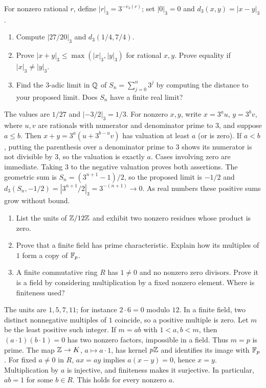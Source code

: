 For nonzero rational $r$, define $|r|_3=3^{-v_3(r)}$; set $|0|_3=0$
and $d_3(x,y)=|x-y|_3$.
\begin{enumerate}
\item Compute $|27/20|_3$ and $d_3(1/4,7/4)$. 
\item Prove $|x+y|_3\le\max(|x|_3,|y|_3)$ for rational $x,y$.
Prove equality if $|x|_3\ne|y|_3$. 
\item Find the $3$-adic limit in $\mathbb Q$ of $S_n=\sum_{j=0}^n3^j$ by
computing the distance to your proposed limit. Does $S_n$ have a finite
real limit? 
\end{enumerate}
\begin{solution}
The values are $1/27$ and $|-3/2|_3=1/3$.
For nonzero $x,y$, write $x=3^a u$, $y=3^b v$, where $u,v$ are
rationals with numerator and denominator prime to $3$, and suppose $a\le b$.
Then $x+y=3^a(u+3^{b-a}v)$ has valuation at least $a$ (or is zero).
If $a<b$, putting the parenthesis over a denominator prime to $3$
shows its numerator is not divisible by $3$, so the valuation is exactly
$a$. Cases involving zero are immediate. Taking $3$ to the negative
valuation proves both assertions.
The geometric sum is $S_n=(3^{n+1}-1)/2$, so the proposed limit is
$-1/2$ and $d_3(S_n,-1/2)=|3^{n+1}/2|_3=3^{-(n+1)}\to0$.
As real numbers these positive sums grow without bound.
\end{solution}

\studentbreak
{}
\begin{enumerate}
\item List the units of $\mathbb Z/12\mathbb Z$ and exhibit two nonzero residues
whose product is zero. 
\item Prove that a finite field has prime characteristic. Explain
how its multiples of $1$ form a copy of $\mathbb F_p$. 
\item A finite commutative ring $R$ has $1\ne0$ and no nonzero zero
divisors. Prove it is a field by considering multiplication by a fixed
nonzero element. Where is finiteness used? 
\end{enumerate}
\begin{solution}
The units are $1,5,7,11$; for instance $2\cdot6=0$ modulo $12$.
In a finite field, two distinct nonnegative multiples of $1$ coincide,
so a positive multiple is zero. Let $m$ be the least positive such
integer. If $m=ab$ with $1<a,b<m$, then
$(a\cdot1)(b\cdot1)=0$ has two nonzero factors, impossible in a field.
Thus $m=p$ is prime. The map $\mathbb Z\to K$, $a\mapsto a\cdot1$, has
kernel $p\mathbb Z$ and identifies its image with $\mathbb F_p$.
For fixed $a\ne0$ in $R$, $ax=ay$ implies $a(x-y)=0$, hence $x=y$.
Multiplication by $a$ is injective, and finiteness makes it surjective.
In particular, $ab=1$ for some $b\in R$. This holds for every nonzero $a$.
\end{solution}

